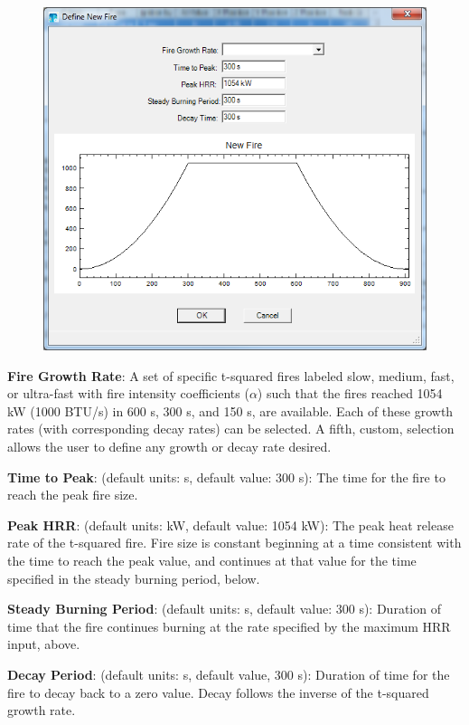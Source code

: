 \begin{figure}[h!]
\begin{center}
\includegraphics[width=5in]{FIGURES/Input_File/Create_t2}
\end{center}
\end{figure}

\textbf{Fire Growth Rate}: A set of specific t-squared fires labeled slow, medium, fast, or ultra-fast with fire intensity coefficients ($\alpha$) such that the fires reached 1054 kW (1000 BTU/s) in 600 s, 300 s, and 150 s, are available.  Each of these growth rates (with corresponding decay rates) can be selected. A fifth, custom, selection allows the user to define any growth or decay rate desired.

\textbf{Time to Peak}: (default units: s, default value: 300 s): The time for the fire to reach the peak fire size.

\textbf{Peak HRR}: (default units: kW, default value: 1054 kW): The peak heat release rate of the t-squared fire.  Fire size is constant beginning at a time consistent with the time to reach the peak value,   and continues at that value for the time specified in the steady burning period, below.

\textbf{Steady Burning Period}: (default units: s, default value: 300 s): Duration of time that the fire continues burning at the rate specified by the maximum HRR input, above.

\textbf{Decay Period}: (default units: s, default value, 300 s): Duration of time for the fire to decay back to a zero value.  Decay follows the inverse of the t-squared growth rate.


